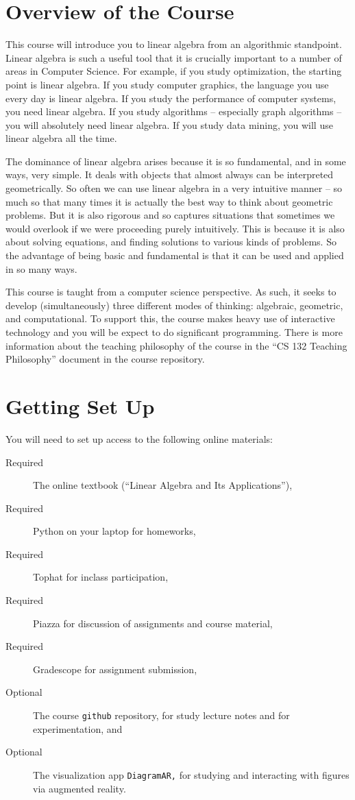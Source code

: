 \documentclass[11pt]{article}
\begin{document}
\section*{Overview of the Course}

This course will introduce you to linear algebra from an algorithmic
standpoint.  Linear algebra is such a useful tool that it is crucially
important to a number of areas in Computer Science. For example, if you study
optimization, the starting point is linear algebra. If you study
computer graphics, the language you use every day is linear algebra. If
you study the performance of computer systems, you need linear
algebra. If you study algorithms -- especially graph algorithms -- you
will absolutely need linear algebra. If you study data mining, you will
use linear algebra all the time. 

The dominance of linear algebra arises because it is so fundamental, and
in some ways, very simple. It deals with objects that almost always can
be interpreted geometrically. So often we can use linear algebra in a
very intuitive manner -- so much so that many times it is actually the
best way to think about geometric problems. But it is also rigorous and so
captures situations that sometimes we would overlook if we were
proceeding purely intuitively. This is because it is also about solving
equations, and finding solutions to various kinds of problems. So the
advantage of being basic and fundamental is that it can be used and
applied in so many ways. 

This course is taught from a computer science perspective.  As such, it
seeks to develop (simultaneously) three different modes of thinking:
algebraic, geometric, and computational.    To support this, the course
makes heavy use of interactive technology and you will be expect to do
significant programming.    There is more information about the teaching
philosophy of the course in the ``CS 132 Teaching Philosophy'' document
in the course repository.

\section*{Getting Set Up}

You will need to set up access to the following online materials:

\begin{description}
\item[Required] The online textbook (``Linear Algebra and Its
  Applications''),
\item[Required] Python on your laptop for homeworks, 
\item[Required] Tophat for inclass participation,
\item[Required] Piazza for discussion of assignments and course material,
\item[Required] Gradescope for assignment submission, 
\item[Optional] The course \texttt{github} repository, for study lecture
  notes and for experimentation, and
\item[Optional] The visualization app \texttt{DiagramAR,} for
  studying and interacting with figures via augmented reality.
\end{description}
\end{document}
